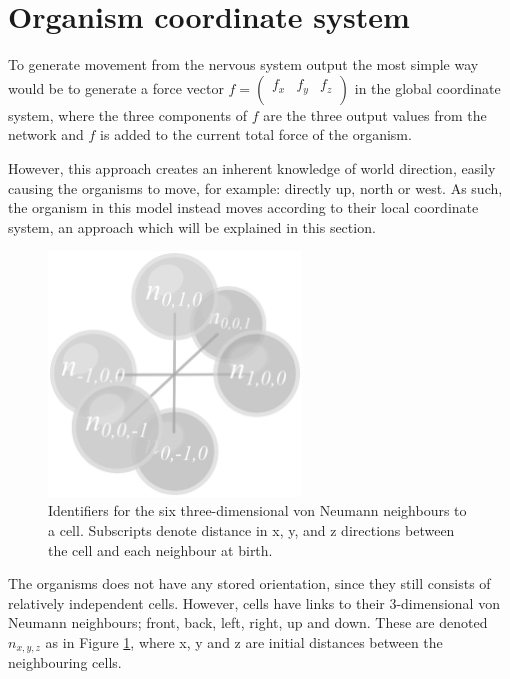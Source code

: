 \section{Organism coordinate system}
To generate movement from the nervous system output the most simple way would be to generate a force vector \(f=\left(\begin{array}{ccc} f_x & f_y & f_z \\\end{array}\right)\) in the global coordinate system, where the three components of \(f\) are the three output values from the network and \(f\) is added to the current total force of the organism.

However, this approach creates an inherent knowledge of world direction, easily causing the organisms to move, for example: directly up, north or west. As such, the organism in this model instead moves according to their local coordinate system, an approach which will be explained in this section.

\begin{figure}
  \centering
  \includegraphics[width=0.6\textwidth]{figure/neighbours}
  \caption{Identifiers for the six three-dimensional von Neumann neighbours to a cell. Subscripts denote distance in x, y, and z directions between the cell and each neighbour at birth.}
  \label{fig:neighbours} 
\end{figure}

The organisms does not have any stored orientation, since they still consists of relatively independent cells. However, cells have links to their 3-dimensional von Neumann neighbours; front, back, left, right, up and down. These are denoted \(n_{x,y,z}\) as in Figure \ref{fig:neighbours}, where x, y and z are initial distances between the neighbouring cells.

